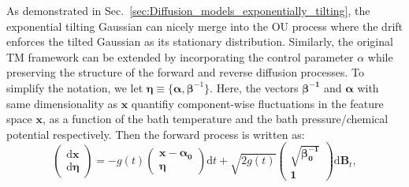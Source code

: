 \documentclass[aip,jcp,reprint,longbibliography]{revtex4-1}
\begin{document}
As demonstrated in Sec.~\ref{sec:Diffusion_models_exponentially_tilting}, the exponential tilting Gaussian can nicely merge into the OU process where the drift enforces the tilted Gaussian as its stationary distribution. Similarly, the original TM framework can be extended by incorporating the control parameter $\alpha$ while preserving the structure of the forward and reverse diffusion processes. To simplify the notation, we let $\boldsymbol{\eta}\equiv \{{\boldsymbol{\alpha},\boldsymbol\beta^{-1}}\}$. Here, the vectors $\boldsymbol{\beta^{-1}}$ and $\boldsymbol{\alpha}$ with same dimensionality as $\mathbf{x}$ quantifiy component-wise fluctuations in the feature space $\mathbf{x}$, as a function of the bath temperature and the bath pressure/chemical potential respectively. Then the forward process is written as: 
\begin{equation}
\begin{pmatrix}
\mathrm{d}\mathbf{x}\\
\mathrm{d}\boldsymbol{\eta}
\end{pmatrix}
=
-g(t)
\begin{pmatrix}
\mathbf{x}-\boldsymbol{\alpha_0}\\
\boldsymbol{\eta}
\end{pmatrix}
\mathrm{d}t
+ \sqrt{2 g(t)} 
\begin{pmatrix}
\sqrt{\boldsymbol{\beta_0^{-1}}} \\
\mathbf{1}
\end{pmatrix}
\mathrm{d}\mathbf{B}_t,
\label{eq:tilting_forward_force}
\end{equation}
\end{document}
